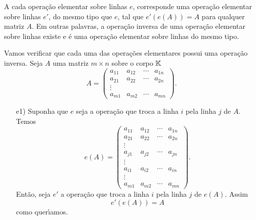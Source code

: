 \begin{teorema}
	A cada opera\c{c}\~ao elementar sobre linhas $e$, corresponde uma opera\c{c}\~ao elementar sobre linhas $e'$, do mesmo tipo que $e$, tal que $e'(e(A)) = A$ para qualquer matriz $A$. Em outras palavras, a opera\c{c}\~ao inversa de uma opera\c{c}\~ao elementar sobre linhas existe e \'e uma opera\c{c}\~ao elementar sobre linhas do mesmo tipo.
\end{teorema}
\begin{prova}
	Vamos verificar que cada uma das opera\c{c}\~oes elementares possui uma opera\c{c}\~ao inversa. Seja $A$ uma matriz $m \times n$ sobre o corpo $\mathbb{K}$
	\[
		A = \begin{pmatrix}
			a_{11} & a_{12} & \cdots & a_{1n}\\
			a_{21} & a_{22} & \cdots & a_{2n}\\
			\vdots\\
			a_{m1} & a_{m2} & \cdots & a_{mn}
		\end{pmatrix}.
	\]
	\begin{enumerate}
		\item [e1)] Suponha que $e$ seja a opera\c{c}\~ao que troca a linha $i$ pela linha $j$ de $A$. Temos
		\[
		   e(A) = 
		   			\begin{pmatrix}
						a_{11} & a_{12} & \cdots & a_{1n}\\
						a_{21} & a_{22} & \cdots & a_{2n}\\
						\vdots\\
						a_{j1} & a_{j2} & \cdots & a_{jn}\\
						\vdots\\
						a_{i1} & a_{i2} & \cdots & a_{in}\\
						\vdots\\
						a_{m1} & a_{m2} & \cdots & a_{mn}
				    \end{pmatrix}.
		\]
		Ent\~ao, seja $e'$ a opera\c{c}\~ao que troca a linha $i$ pela linha $j$ de $e(A)$. Assim
		\[
			e'(e(A)) = A
		\]
		como quer{\'\i}amos.


\end{enumerate}
\end{prova}
